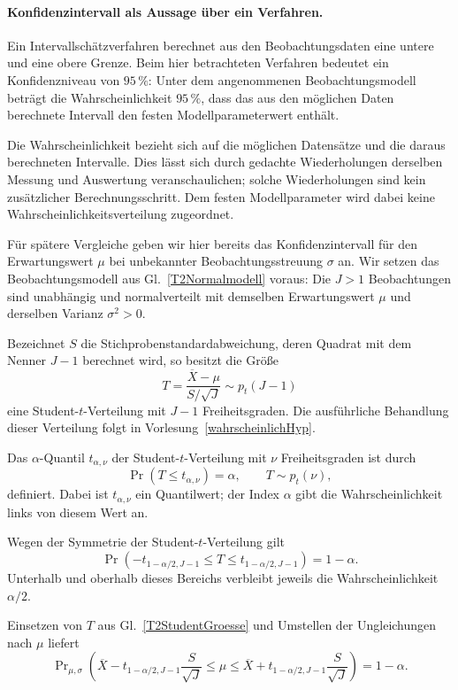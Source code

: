 \paragraph{Konfidenzintervall als Aussage über ein Verfahren.}
Ein Intervallschätzverfahren berechnet aus den Beobachtungsdaten
eine untere und eine obere Grenze. Beim hier betrachteten Verfahren
bedeutet ein Konfidenzniveau von $95\,\%$: Unter dem angenommenen
Beobachtungsmodell beträgt die Wahrscheinlichkeit $95\,\%$, dass
das aus den möglichen Daten berechnete Intervall den festen
Modellparameterwert enthält.

Die Wahrscheinlichkeit bezieht sich auf die möglichen Datensätze
und die daraus berechneten Intervalle. Dies lässt sich durch gedachte
Wiederholungen derselben Messung und Auswertung veranschaulichen;
solche Wiederholungen sind kein zusätzlicher Berechnungsschritt.
Dem festen Modellparameter wird dabei keine
Wahrscheinlichkeitsverteilung zugeordnet.

Für spätere Vergleiche geben wir hier bereits das Konfidenzintervall
für den Erwartungswert $\mu$ bei unbekannter Beobachtungsstreuung
$\sigma$ an. Wir setzen das Beobachtungsmodell aus
Gl.~\eqref{T2Normalmodell} voraus: Die $J>1$ Beobachtungen sind
unabhängig und normalverteilt mit demselben Erwartungswert $\mu$
und derselben Varianz $\sigma^2>0$.

Bezeichnet $S$ die Stichprobenstandardabweichung, deren Quadrat
mit dem Nenner $J-1$ berechnet wird, so besitzt die Größe
\begin{equation}
T=\frac{\overline X-\mu}{S/\sqrt J}
\sim p_t(J-1)
\label{T2StudentGroesse}
\end{equation}
eine Student-$t$-Verteilung mit $J-1$ Freiheitsgraden.
Die ausführliche Behandlung dieser Verteilung folgt in
Vorlesung~\ref{wahrscheinlichHyp}.

Das $\alpha$-Quantil $t_{\alpha,\nu}$ der Student-$t$-Verteilung
mit $\nu$ Freiheitsgraden ist durch
\[
\Pr\!\left(T\le t_{\alpha,\nu}\right)=\alpha,
\qquad T\sim p_t(\nu),
\]
definiert. Dabei ist $t_{\alpha,\nu}$ ein Quantilwert; der Index
$\alpha$ gibt die Wahrscheinlichkeit links von diesem Wert an.

Wegen der Symmetrie der Student-$t$-Verteilung gilt
\[
\Pr\!\left(
-t_{1-\alpha/2,J-1}\le T\le t_{1-\alpha/2,J-1}
\right)=1-\alpha.
\]
Unterhalb und oberhalb dieses Bereichs verbleibt jeweils die
Wahrscheinlichkeit $\alpha/2$.

Einsetzen von $T$ aus Gl.~\eqref{T2StudentGroesse} und Umstellen
der Ungleichungen nach $\mu$ liefert
\begin{equation}
\Pr\nolimits_{\mu,\sigma}\!\left(
\overline X-t_{1-\alpha/2,J-1}\frac{S}{\sqrt J}
\le\mu\le
\overline X+t_{1-\alpha/2,J-1}\frac{S}{\sqrt J}
\right)=1-\alpha.
\end{equation}

